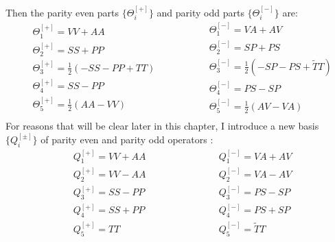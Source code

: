 \documentclass[english, LaM, oneside, noexaminfo]{sapthesis}
\begin{document}
Then the parity even parts $\{\Theta_i^{[+]}\}$ and parity odd parts $\{\Theta_i^{[-]}\}$ are:
\begin{equation}\label{eq:Theta_i-final}
    \begin{split}
        & \Theta_1^{[+]} = VV + AA \\
        & \Theta_2^{[+]} = SS + PP \\
        & \Theta_3^{[+]} = \frac{1}{2}\left(-SS-PP +TT\right) \\
        & \Theta_4^{[+]} = SS - PP \\
        & \Theta_5^{[+]} = \frac{1}{2}\left(AA-VV\right) \\
    \end{split}
  \qquad\qquad
    \begin{split}
        & \Theta_1^{[-]} = VA + AV \\
        & \Theta_2^{[-]} = SP + PS \\
        & \Theta_3^{[-]} = \frac{1}{2}\left(-SP-PS +\tilde{T}T\right) \\
        & \Theta_4^{[-]} = PS - SP \\
        & \Theta_5^{[-]} = \frac{1}{2}\left(AV-VA\right) \\
    \end{split}
\end{equation}
For reasons that will be clear later in this chapter, I introduce a new basis $\{Q_i^{[\pm]}\}$ of parity even and parity odd operators \cite{DoniniMartinelliOperators}:
\begin{equation}\label{eq:Q_i-continuum}
    \begin{split}
        & Q_1^{[+]} = VV + AA \\
        & Q_2^{[+]} = VV - AA \\
        & Q_3^{[+]} = SS - PP \\
        & Q_4^{[+]} = SS + PP \\
        & Q_5^{[+]} = TT \\
    \end{split}
  \qquad\qquad\qquad
    \begin{split}
        & Q_1^{[-]} = VA + AV \\
        & Q_2^{[-]} = VA - AV \\
        & Q_3^{[-]} = PS - SP \\
        & Q_4^{[-]} = PS + SP \\
        & Q_5^{[-]} = \tilde{T}T \\
    \end{split}
\end{equation}
\end{document}
